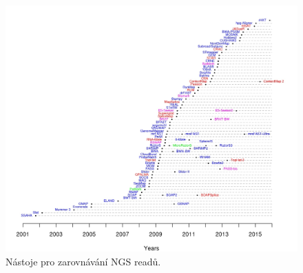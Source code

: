 \documentclass[czech,DP]{thesiskiv}
\numberwithin{equation}{section}
\begin{document}
\begin{figure}[H]		
		\centering
		\includegraphics[width=1\textwidth]{./img/ngs_read_mappers.jpeg}
		\caption{Nástoje pro zarovnávání NGS readů. \cite{ngs_alignment_software}}
		\label{fig:align_tools}
\end{figure}
\end{document}
